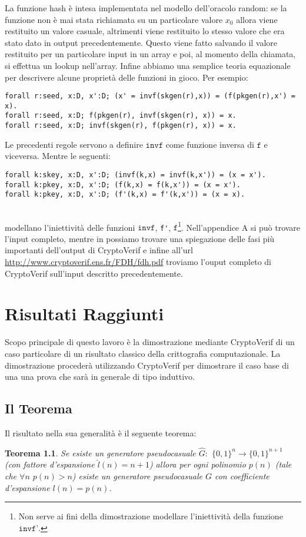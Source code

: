 \documentclass[a4paper,openright,twoside,12pt]{report}
\newtheorem{teorema}{Teorema}[chapter]
\begin{document}
La funzione hash \`e intesa implementata nel modello dell'oracolo random: se la funzione non \`e mai stata richiamata su un particolare valore $x_0$ allora viene restituito un valore casuale, 
altrimenti viene restituito lo stesso valore che era stato dato in output precedentemente. Questo viene fatto salvando il valore restituito per un particolare input in un array e poi,
al momento della chiamata, si effettua un lookup nell'array.
Infine abbiamo una semplice teoria equazionale per descrivere alcune propriet\`a delle funzioni in gioco.
Per esempio:
\begin{verbatim}
forall r:seed, x:D, x':D; (x' = invf(skgen(r),x)) = (f(pkgen(r),x') = x).
forall r:seed, x:D; f(pkgen(r), invf(skgen(r), x)) = x.
forall r:seed, x:D; invf(skgen(r), f(pkgen(r), x)) = x.
\end{verbatim}
Le precedenti regole servono a definire $\texttt{invf}$ come funzione inversa di $\texttt{f}$ e viceversa. Mentre le seguenti:
\begin{verbatim}
forall k:skey, x:D, x':D; (invf(k,x) = invf(k,x')) = (x = x').
forall k:pkey, x:D, x':D; (f(k,x) = f(k,x')) = (x = x').
forall k:pkey, x:D, x':D; (f'(k,x) = f'(k,x')) = (x = x).
\end{verbatim}\\
modellano l'iniettivit\`a delle funzioni $\texttt{invf}$, \verb!f'!, $\texttt{f}$\footnote{Non serve ai fini della dimostrazione modellare l'iniettivit\`a della funzione $\texttt{invf'}$. }.
Nell'appendice A si pu\`o trovare l'input completo, mentre in \cite{BlanchetPointchevalCrypto06} possiamo trovare una spiegazione delle fasi 
pi\`u importanti dell'output di CryptoVerif e infine all'url \url{http://www.cryptoverif.ens.fr/FDH/fdh.pdf} troviamo l'ouput completo di CryptoVerif sull'input descritto precedentemente.

\chapter{Risultati Raggiunti}
Scopo principale di questo lavoro \`e la dimostrazione mediante CryptoVerif di un caso particolare di un risultato classico della crittografia computazionale. 
La dimostrazione proceder\`a utilizzando CryptoVerif per dimostrare il caso base 
di una una prova che sar\`a in generale di tipo induttivo.
\section{Il Teorema}
Il risultato nella sua generalit\`a \`e il seguente teorema:
\begin{teorema}
Se esiste un generatore pseudocasuale $\hat{G}:$ $\{0, 1\}^n \rightarrow \{0, 1\}^{n+1}$ (con fattore 
d'espansione $\hat{l}(n)=n+1$) allora per ogni polinomio $p(n)$ (tale che $\forall n$ $p(n)>n$)
esiste un generatore pseudocasuale $G$ con coefficiente d'espansione $l(n)=p(n)$.
\end{teorema}
\end{document}
